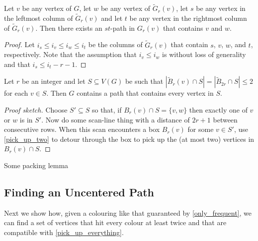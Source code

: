 \documentclass{patmorin}
\begin{document}
\begin{lem}\label{pick_up_two}
  Let $v$ be any vertex of $G$, let $w$ be any vertex of $\tilde{G}_r(v)$, let $s$ be any vertex in the leftmost column of $\tilde{G}_r(v)$ and let $t$ be any vertex in the rightmost column of $\tilde{G}_r(v)$.  Then there exists an $st$-path in $G_r(v)$ that contains $v$ and $w$.
\end{lem}

\begin{proof}
  Let $i_s \le i_v \le i_w \le i_t$ be the columns of $\tilde{G}_r(v)$ that contain $s$, $v$, $w$, and $t$, respectively.  Note that the assumption that $i_v \le i_w$ is without loss of generality and that $i_s \le i_t - r -1$.
\end{proof}

\begin{lem}\label{pick_up_everything}
  Let $r$ be an integer and let $S\subseteq V(G)$ be such that $|\tilde{B}_{r}(v)\cap S|=|\tilde{B}_{2r}\cap S|\le 2$ for each $v\in S$.  Then $G$ contains a path that contains every vertex in $S$. 
\end{lem}

\begin{proof}[Proof sketch]
  Choose $S'\subseteq S$ so that, if $B_r(v)\cap S=\{v,w\}$ then exactly one of $v$ or $w$ is in $S'$. Now do some scan-line thing with a distance of $2r+1$ between consecutive rows.  When this scan encounters a box $B_r(v)$ for some $v\in S'$, use \cref{pick_up_two} to detour through the box to pick up the (at most two) vertices in $B_r(v)\cap S$.
\end{proof}

\begin{lem}\label{packing_lemma}
  Some packing lemma
\end{lem}

\subsection{Finding an Uncentered Path}

Next we show how, given a colouring like that guaranteed by \cref{only_frequent}, we can find a set of vertices that hit every colour at least twice and that are compatible with \cref{pick_up_everything}.
\end{document}
